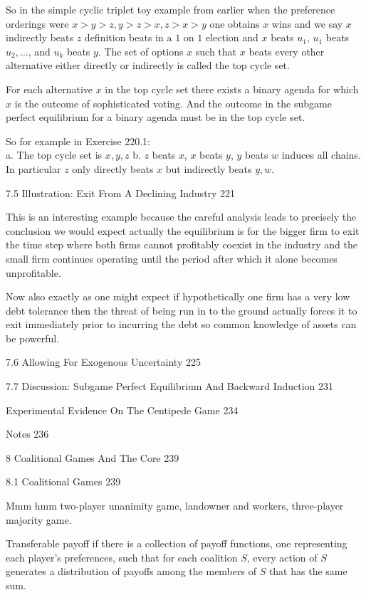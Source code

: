 So in the simple cyclic triplet toy example from earlier when the preference orderings were $x>y>z,y>z>x,z>x>y$ one obtains $x$ wins and we say $x$ indirectly beats $z$ definition beats in a $1$ on $1$ election and $x$ beats $u_1$, $u_1$ beats $u_2,\dots$, and $u_k$ beats $y$. The set of options $x$ such that $x$ beats every other alternative either directly or indirectly is called the top cycle set.

For each alternative $x$ in the top cycle set there exists a binary agenda for which $x$ is the outcome of sophisticated voting. And the outcome in the subgame perfect equilibrium for a binary agenda must be in the top cycle set.

So for example in Exercise 220.1: \\
a. The top cycle set is $\boxed{x,y,z}$
b. $z$ beats $x$, $x$ beats $y$, $y$ beats $w$ induces all chains. In particular $z$ only directly beats $x$ but indirectly beats $y,w$.

7.5 Illustration: Exit From A Declining Industry 221

This is an interesting example because the careful analysis leads to precisely the conclusion we would expect actually the equilibrium is for the bigger firm to exit the time step where both firms cannot profitably coexist in the industry and the small firm continues operating until the period after which it alone becomes unprofitable.

Now also exactly as one might expect if hypothetically one firm has a very low debt tolerance then the threat of being run in to the ground actually forces it to exit immediately prior to incurring the debt so common knowledge of assets can be powerful.

7.6 Allowing For Exogenous Uncertainty 225



7.7 Discussion: Subgame Perfect Equilibrium And Backward Induction 231



Experimental Evidence On The Centipede Game 234



Notes 236



8 Coalitional Games And The Core 239



8.1 Coalitional Games 239

Mmm hmm two-player unanimity game, landowner and workers, three-player majority game.

Transferable payoff if there is a collection of payoff functions, one representing each player's preferences, such that for each coalition $S$, every action of $S$ generates a distribution of payoffs among the members of $S$ that has the same sum.

